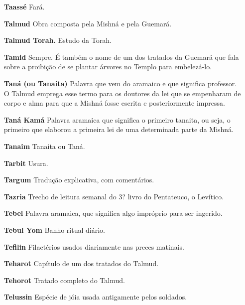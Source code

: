 \begin{itemize}
\item[\textbf{Taassé}] Fará.

\item[\textbf{Talmud}] Obra composta pela Mish­ná e pela Guemará.

\item[\textbf{Talmud Torah.}] Estudo da Torah.


\item[\textbf{Tamid}] Sempre. É também o nome de um dos tratados da Guemará que fala
sobre a proibição de se plantar árvo­res no Templo para embelezá-lo.

\item[\textbf{Taná (ou Tanaita)}] Palavra que vem do aramaico e que significa
professor. O Talmud emprega esse termo para os doutores da lei que se
empenharam de corpo e alma para que a Mishná fosse escrita e
posteriormente impressa.

\item[\textbf{Taná Kamá}] Palavra aramaica que sig­nifica o primeiro tanaita,
ou seja, o pri­meiro que elaborou a primeira lei de uma determinada
parte da Mishná.

\item[\textbf{Tanaim}] Tanaita ou Taná.

\item[\textbf{Tarbit}] Usura.

\item[\textbf{Targum}] Tradução explicativa, com comentários.

\item[\textbf{Tazria}] Trecho de leitura semanal do 3? livro do Pentateuco, o
Levítico.

\item[\textbf{Tebel}] Palavra aramaica, que signifi­ca algo
impróprio para ser ingerido.

\item[\textbf{Tebul Yom}] Banho ritual diário.

\item[\textbf{Tefilin}] Filactérios usados diariamen­te nas preces matinais.

\item[\textbf{Teharot}] Capítulo de um dos tratados do Talmud.

\item[\textbf{Tehorot}] Tratado completo do Tal­mud.

\item[\textbf{Telussin}] Espécie de jóia usada anti­gamente pelos soldados.


\end{itemize}
